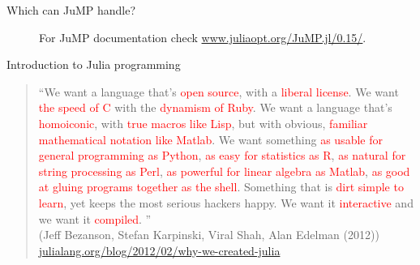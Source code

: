 \documentclass{beamer}
\begin{document}
\begin{frame}{Which can JuMP handle?}

  \begin{figure}[htpb]
    \centering
  \caption{For JuMP documentation check \url{www.juliaopt.org/JuMP.jl/0.15/}.}
  \end{figure}

\end{frame}


\begin{frame}
  \begin{center}
    Introduction to Julia programming
    \end{center}
\end{frame}


\begin{frame}
  \begin{quote}\footnotesize

  ``We want a language that’s \textcolor<2->{red}{open source}, with a \textcolor<3->{red}{liberal license}. We want \textcolor<4->{red}{the speed of C} with the \textcolor<5->{red}{dynamism of Ruby}. We want a language that’s \textcolor<6->{red}{homoiconic}, with \textcolor<7->{red}{true macros like Lisp}, but with obvious, \textcolor<8->{red}{familiar mathematical notation like Matlab}. We want something \textcolor<9->{red}{as usable for general programming as Python}, \textcolor<10->{red}{as easy for statistics as R}, \textcolor<11->{red}{as natural for string processing as Perl}, \textcolor<12->{red}{as powerful for linear algebra as Matlab}, \textcolor<13->{red}{as good at gluing programs together as the shell}. Something that is \textcolor<14->{red}{dirt simple to learn}, yet keeps the most serious hackers happy. We want it \textcolor<15->{red}{interactive} and we want it \textcolor<16->{red}{compiled}.
\newline
{}''\\
(Jeff Bezanson, Stefan Karpinski, Viral Shah, Alan Edelman (2012))
\url{julialang.org/blog/2012/02/why-we-created-julia}
     \end{quote}
\end{frame}
\end{document}
